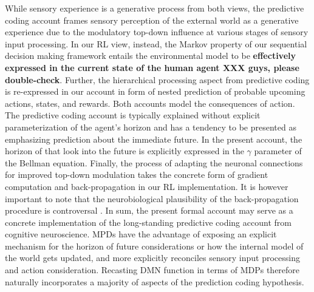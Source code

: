\documentclass[10pt,letterpaper]{article}
\newcommand{\suggestremove}[1]{{\color{red} \sout{#1}}}
\begin{document}
While sensory experience is a generative process from both views,
the predictive coding account frames
sensory perception of the external world
as a generative experience due to the modulatory top-down influence at
various stages of sensory input processing.
In our RL view, instead,
the Markov property of our sequential decision making framework entails
the environmental model to be
\textbf{effectively expressed in the current state of the human agent
XXX guys, please double-check}.
Further,
the hierarchical processing aspect from predictive coding
is re-expressed in our account in form of
nested prediction of probable upcoming actions, states, and rewards.
Both accounts model the consequences of action.
The predictive coding account is typically explained without
explicit parameterization of the agent's horizon and
has a tendency to be presented as emphasizing prediction about the
immediate future.
In the present account, the horizon of that
look into the future is explicitly expressed in the $\gamma$ parameter
of the Bellman equation.
Finally,
the process of adapting the neuronal connections
for improved top-down modulation
takes the concrete form of gradient computation and
back-propagation in our RL implementation.
It is however important to note that
the neurobiological plausibility of
the back-propagation procedure is controversal
\citep{goodfellow2016deep}.
In sum,
the present formal account may serve as a concrete implementation of
the long-standing predictive coding account from cognitive neuroscience.
MPDs have the advantage of exposing an explicit
mechanism for the horizon of future considerations or
how the internal model of the world gets updated,
and
more explicitly reconciles sensory input processing and action consideration.
%
Recasting DMN function in terms of MDPs therefore naturally incorporates
a majority of aspects of the prediction coding hypothesis.
\end{document}
